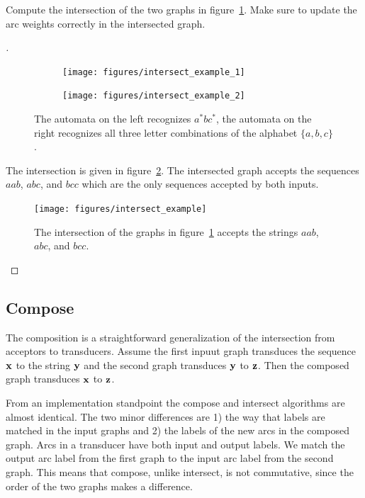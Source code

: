 \begin{example}
Compute the intersection of the two graphs in
figure~\ref{fig:intersect_example_inputs}. Make sure to update the arc
weights correctly in the intersected graph.
\end{example}

\begin{proof}[\unskip\nopunct]
\begin{figure}
    \centering
    \begin{subfigure}[b]{0.3\textwidth}
        \centering
        \texttt{[image: figures/intersect\_example\_1]}
    \end{subfigure}
    \begin{subfigure}[b]{0.68\textwidth}
        \centering
        \texttt{[image: figures/intersect\_example\_2]}
    \end{subfigure}
    \caption{The automata on the left recognizes $a^*bc^*$, the automata on the
    right recognizes all three letter combinations of the alphabet $\{a, b,
    c\}$.}
    \label{fig:intersect_example_inputs}
\end{figure}

The intersection is given in figure~\ref{fig:intersect_example}. The
intersected graph accepts the sequences $aab$, $abc$, and $bcc$ which are
the only sequences accepted by both inputs.

\begin{figure}
    \centering
    \texttt{[image: figures/intersect\_example]}
    \caption{The intersection of the graphs in
    figure~\ref{fig:intersect_example_inputs} accepts the strings $aab$, $abc$,
    and $bcc$.}
    \label{fig:intersect_example}
\end{figure}
\end{proof}

\subsection{Compose}

The composition is a straightforward generalization of the intersection from
acceptors to transducers. Assume the first inpuut graph transduces the sequence
${\bf x}$ to the string ${\bf y}$ and the second graph transduces ${\bf y}$ to ${\bf z}$. Then
the composed graph transduces ${\bf x}$ to ${\bf z}$.

From an implementation standpoint the compose and intersect algorithms are
almost identical. The two minor differences are 1) the way that labels are
matched in the input graphs and 2) the labels of the new arcs in the composed
graph. Arcs in a transducer have both input and output labels. We match the
output arc label from the first graph to the input arc label from the second
graph. This means that compose, unlike intersect, is not commutative, since the
order of the two graphs makes a difference.

